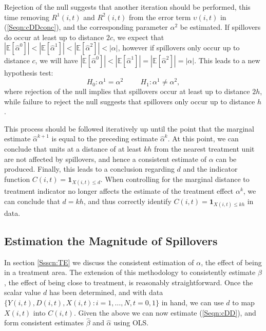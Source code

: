 Rejection of the null suggests that another iteration should be performed, this time
removing $R^1(i,t)$ and $R^2(i,t)$ from the error term $\upsilon(i,t)$ in 
(\ref{Seqn:cDDconc}), and the corresponding 
parameter $\alpha^2$ be estimated.  If spillovers do occur at least up to distance 
$2c$, we expect that $|\mathbb{E}[\hat\alpha^0]|<|\mathbb{E}[\hat\alpha^1]|<
|\mathbb{E}[\hat\alpha^2]|<|\alpha|$, however if spillovers only occur up to distance
$c$, we will have $|\mathbb{E}[\hat\alpha^0]|<|\mathbb{E}[\hat\alpha^1]|=
|\mathbb{E}[\hat\alpha^2]|=|\alpha|$.  This leads to a new hypothesis test:
\[
H_0: \alpha^1=\alpha^2 \hspace{1cm}
H_1: \alpha^1\neq\alpha^2,
\]
where rejection of the null implies that spillovers occur at least up to distance
$2h$, while failure to reject the null suggests that spillovers only occur up to 
distance $h$.

This process should be followed iteratively up until the point that the marginal 
estimate $\hat\alpha^{k+1}$ is equal to the preceding estimate $\hat\alpha^{k}$.  
At this point, we can conclude that units at a distance of at least $kh$ from 
the nearest treatment unit are not affected by spillovers, and hence a 
consistent estimate of $\alpha$ can be produced. Finally, this leads to a 
conclusion regarding $d$ and the indicator function $C(i,t)=\mathbf{1}_{X(i,t)
\leq d}$.  When controlling for the marginal distance to treatment indicator no 
longer affects the estimate of the treatment effect $\alpha^k$, we can conclude 
that $d=kh$, and thus correctly identify $C(i,t)=\mathbf{1}_{X(i,t)\leq kh}$ in 
data.


\subsection{Estimation the Magnitude of Spillovers}
\label{Ssscn:SE}
In section \ref{Ssscn:TE} we discuss the consistent estimation of $\alpha$, the
effect of being in a treatment area.  The extension of this methodology to 
consistently estimate $\beta$, the effect of being close to treatment, is 
reasonably straightforward.  Once the scalar value $d$ has been determined, and
with data $\{Y(i,t), D(i,t), X(i,t): i=1, \ldots, N, t=0, 1\}$ in hand, we can 
use $d$ to map $X(i,t)$ into $C(i,t)$. Given the above we can now estimate 
(\ref{Seqn:cDD}), and form consistent estimates $\hat\beta$ and $\hat\alpha$ 
using OLS.

